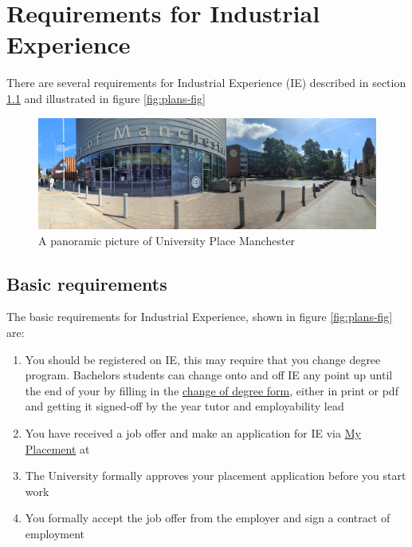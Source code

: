 \documentclass[
]{book}
\providecommand{\tightlist}{%
  \setlength{\itemsep}{0pt}\setlength{\parskip}{0pt}}
\begin{document}
\chapter{Requirements for Industrial Experience}\label{requirements}

There are several requirements for Industrial Experience (IE) described in section \ref{basic} and illustrated in figure \ref{fig:plans-fig}

\begin{figure}

{\centering \includegraphics[width=1\linewidth]{images/uniplace} 

}

\caption{A panoramic picture of University Place Manchester}\label{fig:reqs-fig}
\end{figure}



\section{Basic requirements}\label{basic}

The basic requirements for Industrial Experience, shown in figure \ref{fig:plans-fig} are:

\begin{enumerate}
\def\labelenumi{\arabic{enumi}.}
\tightlist
\item
  You should be registered on IE, this may require that you change degree program. Bachelors students can change onto and off IE any point up until the end of your by filling in the \href{https://studentnet.cs.manchester.ac.uk/ugt/changedegree.php}{change of degree form}, either in print or pdf and getting it signed-off by the year tutor and employability lead \citep{changedegree}
\item
  You have received a job offer and make an application for IE via \href{https://studentmobility.manchester.ac.uk}{My Placement} at \citep{myplacement}
\item
  The University formally approves your placement application before you start work
\item
  You formally accept the job offer from the employer and sign a contract of employment
\end{enumerate}
\end{document}

